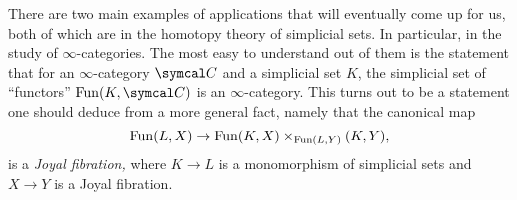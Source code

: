 There are two main examples of applications that will eventually come up for us, both of which are in the homotopy theory of simplicial sets.
In particular, in the study of \(\infty\)-categories. The most easy to understand out of them is the statement that for an \(\infty\)-category \(\calC\)
and a simplicial set \(K\), the simplicial set of ``functors'' \(\Fun(K,\calC)\) is an \(\infty\)-category. This turns out to be a statement one should deduce from a more general fact,
namely that the canonical map
\[ \operatorname{Fun}(L,X) \to \operatorname{Fun}(K,X)\times_{\operatorname{Fun}(L, Y)}(K, Y), \]
is a \emph{Joyal fibration,} where \(K\to L\) is a monomorphism of simplicial sets and \(X\to Y\) is a Joyal fibration.
